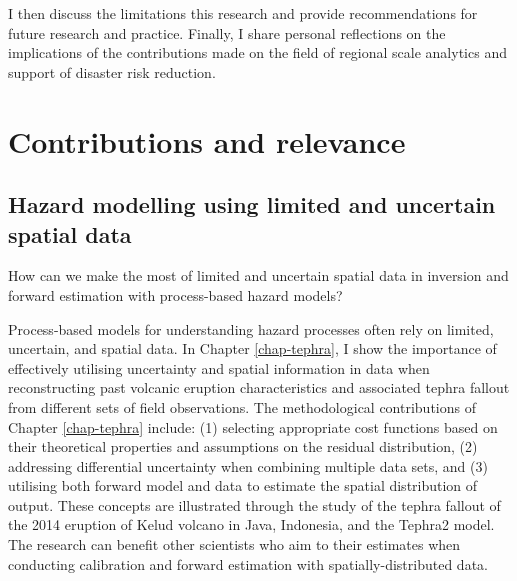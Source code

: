 I then discuss the limitations this research and provide recommendations for future research and practice. Finally, I share personal reflections on the implications of the contributions made on the field of regional scale analytics and support of disaster risk reduction.
\section{Contributions and relevance}

\subsection{Hazard modelling using limited and uncertain spatial data}

\begin{center} \begin{blockquote}
How can we make the most of limited and uncertain spatial data in inversion and forward estimation with process-based hazard models? 
\end{blockquote} \end{center}

Process-based models for understanding hazard processes often rely on limited, uncertain, and spatial data. In Chapter \ref{chap-tephra}, I show the importance of effectively utilising uncertainty and spatial information in data when reconstructing past volcanic eruption characteristics and associated tephra fallout from different sets of field observations. The methodological contributions of Chapter \ref{chap-tephra} include: (1) selecting appropriate cost functions based on their theoretical properties and assumptions on the residual distribution, (2) addressing differential uncertainty when combining multiple data sets, and (3) utilising both forward model and data to estimate the spatial distribution of output. These concepts are illustrated through the study of the tephra fallout of the 2014 eruption of Kelud volcano in Java, Indonesia, and the Tephra2 model. The research can benefit other scientists who aim to their estimates when conducting calibration and forward estimation with spatially-distributed data. 

